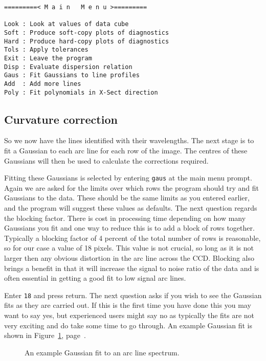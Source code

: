 \documentclass[twoside,11pt]{article}
\newcommand{\scspec}[2]{#1}
\newcommand{\scspec}[2]{#2}
\begin{document}
{\scspec{\small}{ }
\begin{verbatim}
=========< M a i n   M e n u >=========

Look : Look at values of data cube
Soft : Produce soft-copy plots of diagnostics
Hard : Produce hard-copy plots of diagnostics
Tols : Apply tolerances
Exit : Leave the program
Disp : Evaluate dispersion relation
Gaus : Fit Gaussians to line profiles
Add  : Add more lines
Poly : Fit polynomials in X-Sect direction
\end{verbatim}
}

\subsection{Curvature correction}

So we now have the lines identified with their wavelengths. The next
stage is to fit a Gaussian to each arc line for each row of the image.
The centres of these Gaussians will then be used to calculate the
corrections required.

Fitting these Gaussians is selected by entering {\tt gaus} at the main
menu prompt. Again we are asked for the limits over which rows the
program should try and fit Gaussians to the data. These should be the
same limits as you entered earlier, and the program will suggest these
values as defaults. The next question regards the blocking factor.
There is cost in processing time depending on how many Gaussians you
fit and one way to reduce this is to add a block of rows together.
Typically a blocking factor of 4 percent of the total number of rows
is reasonable, so for our case a value of 18 pixels. This value is not
crucial, so long as it is not larger then any obvious distortion in
the arc line across the CCD. Blocking also brings a benefit in that it
will increase the signal to noise ratio of the data and is often
essential in getting a good fit to low signal arc lines.

Enter {\tt 18} and press return. The next question asks if you wish to
see the Gaussian fits as they are carried out. If this is the first
time you have done this you may want to say yes, but experienced users
might say no as typically the fits are not very exciting and do take
some time to go through. An example Gaussian fit is shown in
\scspec{Figure~\ref{arclinefit}, page~\pageref{arclinefit}} {the
figure below}.

\begin{figure}
\begin{center}
  \scspec{\leavevmode\epsfysize=105mm\epsfbox{sc7_15.eps}}
         {\leavevmode\epsfysize=136mm}

  \parbox{140mm}{
    \caption{An example Gaussian fit to an arc line spectrum.}
    \label{arclinefit}
  }
\end{center}
\end{figure}
\end{document}
